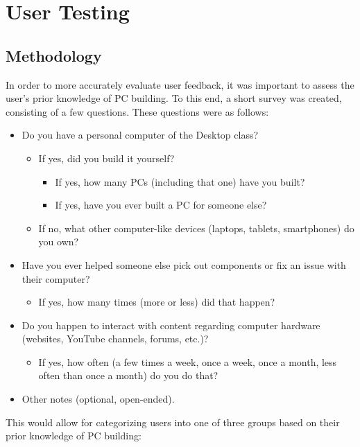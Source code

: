 \section{User Testing}
\label{sec:user-testing}

\subsection{Methodology}

In order to more accurately evaluate user feedback, it was important to assess the user's prior knowledge of PC building.
To this end, a short survey was created, consisting of a few questions.
These questions were as follows:

\begin{itemize}
    \item Do you have a personal computer of the Desktop class?
    \begin{itemize}
        \item If yes, did you build it yourself?
        \begin{itemize}
            \item If yes, how many PCs (including that one) have you built?
            \item If yes, have you ever built a PC for someone else?
        \end{itemize}
        \item If no, what other computer-like devices (laptops, tablets, smartphones) do you own?
    \end{itemize}
    \item Have you ever helped someone else pick out components or fix an issue with their computer?
    \begin{itemize}
        \item If yes, how many times (more or less) did that happen?
    \end{itemize}
    \item Do you happen to interact with content regarding computer hardware (websites, YouTube channels, forums, etc.)?
    \begin{itemize}
        \item If yes, how often (a few times a week, once a week, once a month, less often than once a month) do you do that?
    \end{itemize}
    \item Other notes (optional, open-ended).
\end{itemize}

This would allow for categorizing users into one of three groups based on their prior knowledge of PC building:

